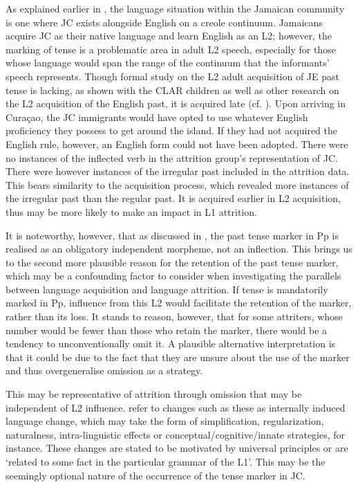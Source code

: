 \documentclass[output=paper,colorlinks,citecolor=brown]{langscibook}
\begin{document}
As explained earlier in , the language situation within the Jamaican community is one where JC exists alongside English on a creole continuum. Jamaicans acquire JC as their native language and learn English as an L2; however, the marking of tense is a problematic area in adult L2 speech, especially for those whose language would span the range of the continuum that the informants’ speech represents. Though formal study on the L2 adult acquisition of JE past tense is lacking, as shown with the CLAR children as well as other research on the L2 acquisition of the English past, it is acquired late (cf. \citealt{DulayBurt1973}).  Upon arriving in Curaçao, the JC immigrants would have opted to use whatever English proficiency they possess to get around the island. If they had not acquired the English rule, however, an English form could not have been adopted. There were no instances of the inflected verb in the attrition group’s representation of JC. There were however instances of the irregular past included in the attrition data. This bears similarity to the acquisition process, which revealed more instances of the irregular past than the regular past. It is acquired earlier in L2 acquisition, thus may be more likely to make an impact in L1 attrition.

It is noteworthy, however, that as discussed in , the past tense marker in Pp is realised as an obligatory independent morpheme, not an inflection. This brings us to the second more plausible reason for the retention of the past tense marker, which may be a confounding factor to consider when investigating the parallels between language acquisition and language attrition. If tense is mandatorily marked in Pp, influence from this L2 would facilitate the retention of the marker, rather than its loss. It stands to reason, however, that for some attriters, whose number would be fewer than those who retain the marker, there would be a tendency to unconventionally omit it. A plausible alternative interpretation is that it could be due to the fact that they are unsure about the use of the marker and thus overgeneralise omission as a strategy.

This may be representative of attrition through omission that may be independent of L2 influence. \citet{SeligerVago1991} refer to changes such as these as internally induced language change, which may take the form of simplification, regularization, naturalness, intra-linguistic effects or conceptual/cognitive/innate strategies, for instance. These changes are stated to be motivated by universal principles or are ‘related to some fact in the particular grammar of the L1’. This may be the seemingly optional nature of the occurrence of the tense marker in JC.
\end{document}
